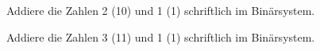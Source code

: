 \begin{exerciseseries}[columns=1,solsubrule=\hrule]{}
    \begin{exercise}
        Addiere die Zahlen 2 (10) und 1 (1) schriftlich im Binärsystem.
        \vspace{5cm}
    \end{exercise}
    \begin{solution}
    \end{solution}
    \begin{exercise}
        Addiere die Zahlen 3 (11) und 1 (1) schriftlich im Binärsystem.
        \vspace{5cm}
    \end{exercise}
    \begin{solution}
    \end{solution}
\end{exerciseseries}

\newpage
\subsection{\solutionsname}
\loadSolutions